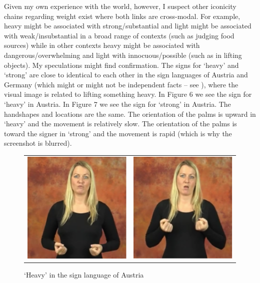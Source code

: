 \documentclass[output=paper,
modfonts
]{LSP/langsci}
\begin{document}
Given my own experience with the world, however, I suspect other
iconicity chains regarding weight exist where both links are
cross-modal. For example, heavy might be associated with
strong/substantial and light might be associated with weak/insubstantial
in a broad range of contexts (such as judging food sources) while in
other contexts heavy might be associated with dangerous/overwhelming and
light with innocuous/possible (such as in lifting objects). My
speculations might find confirmation. The signs for `heavy' and `strong'
are close to identical to each other in the sign languages of Austria
and Germany (which might or might not be independent facts -- see \citealt{napolisanders}), where the visual image is related to lifting
something heavy. In Figure 6 we see the sign for `heavy' in Austria. In
Figure 7 we see the sign for `strong' in Austria. The handshapes and
locations are the same. The orientation of the palms is upward in
`heavy' and the movement is relatively slow. The orientation of the
palms is toward the signer in `strong' and the movement is rapid (which
is why the screenshot is blurred).

\begin{figure}
	\begin{tabularx}{\textwidth}{CC}
		\includegraphics{napoli_fig6a} & \includegraphics{napoli_fig6b}
	\end{tabularx}
	\caption{`Heavy' in the sign language of Austria}
	\label{fig:6}
\end{figure}
\end{document}
